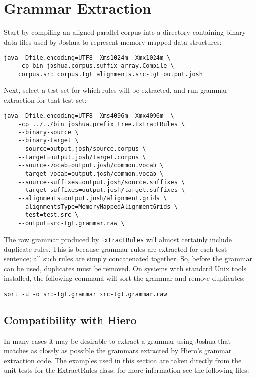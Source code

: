 \chapter{Grammar Extraction}

Start by compiling an aligned parallel corpus into a directory containing binary data files used by Joshua to represent memory-mapped data structures:

\begin{verbatim}
java -Dfile.encoding=UTF8 -Xms1024m -Xmx1024m \
    -cp bin joshua.corpus.suffix_array.Compile \
    corpus.src corpus.tgt alignments.src-tgt output.josh
\end{verbatim}

Next, select a test set for which rules will be extracted, and run grammar extraction for that test set:

\begin{verbatim}
java -Dfile.encoding=UTF8 -Xms4096m -Xmx4096m  \
    -cp ../../bin joshua.prefix_tree.ExtractRules \
    --binary-source \
    --binary-target \
    --source=output.josh/source.corpus \      
    --target=output.josh/target.corpus \      
    --source-vocab=output.josh/common.vocab \      
    --target-vocab=output.josh/common.vocab \  
    --source-suffixes=output.josh/source.suffixes \      
    --target-suffixes=output.josh/target.suffixes \
    --alignments=output.josh/alignment.grids \ 
    --alignmentsType=MemoryMappedAlignmentGrids \
    --test=test.src \
    --output=src-tgt.grammar.raw \
\end{verbatim}

The raw grammar produced by {\tt ExtractRules} will almost certainly include duplicate rules. This is because grammar rules are extracted for each test sentence; all such rules are simply concatenated together. So, before the grammar can be used, duplicates must be removed. On systems with standard Unix tools installed, the following command will sort the grammar and remove duplicates:

\begin{verbatim}
sort -u -o src-tgt.grammar src-tgt.grammar.raw
\end{verbatim}



\section{Compatibility with Hiero}

In many cases it may be desirable to extract a grammar using Joshua that matches as closely as possible the grammars extracted by Hiero's grammar extraction code. The examples used in this section are taken directly from the unit tests for the ExtractRules class; for more information see the following files:

